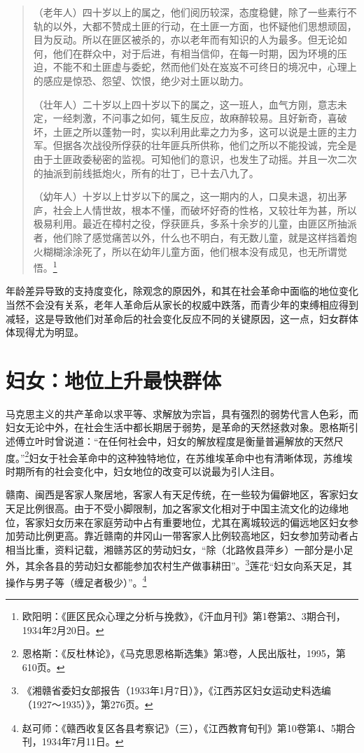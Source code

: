 \begin{quote}

（老年人）四十岁以上的属之，他们阅历较深，态度稳健，除了一些素行不轨的以外，大都不赞成土匪的行动，在土匪一方面，也怀疑他们思想顽固，目为反动。所以在匪区被杀的，亦以老年而有知识的人为最多。但无论如何，他们在群众中，对于后进，有相当信仰，在每一时期，因为环境的压迫，不能不和土匪虚与委蛇，然而他们处在岌岌不可终日的境况中，心理上的感应是惊恐、怨望、饮恨，绝少对土匪以助力。

（壮年人）二十岁以上四十岁以下的属之，这一班人，血气方刚，意志未定，一经刺激，不问事之如何，辄生反应，故麻醉较易。且好新奇，喜破坏，土匪之所以蓬勃一时，实以利用此辈之力为多，这可以说是土匪的主力军。但据各次战役所俘获的壮年匪兵所供称，他们之所以不能投诚，完全是由于土匪政委秘密的监视。可知他们的意识，也发生了动摇。并且一次二次的抽派到前线抵炮火，所有的壮丁，已十去八九了。

（幼年人）十岁以上廿岁以下的属之，这一期内的人，口臭未退，初出茅庐，社会上人情世故，根本不懂，而破坏好奇的性格，又较壮年为甚，所以极易利用。最近在樟村之役，俘获匪兵，多系十余岁的儿童，由匪区所抽派者，他们除了感觉痛苦以外，什么也不明白，有无数儿童，就是这样挡着炮火糊糊涂涂死了，所以在幼年儿童方面，他们根本没有成见，也无所谓觉悟。\footnote{欧阳明：《匪区民众心理之分析与挽救》，《汗血月刊》第1卷第2、3期合刊，1934年2月20日。}
\end{quote}


年龄差异导致的支持度变化，除观念的原因外，和其在社会革命中面临的地位变化当然不会没有关系，老年人革命后从家长的权威中跌落，而青少年的束缚相应得到减轻，这是导致他们对革命后的社会变化反应不同的关键原因，这一点，妇女群体体现得尤为明显。

\section{妇女：地位上升最快群体}


马克思主义的共产革命以求平等、求解放为宗旨，具有强烈的弱势代言人色彩，而妇女无论中外，在社会生活中都长期居于弱势，是革命的天然拯救对象。恩格斯引述傅立叶时曾说道：“在任何社会中，妇女的解放程度是衡量普遍解放的天然尺度。”\footnote{恩格斯：《反杜林论》，《马克思恩格斯选集》第3卷，人民出版社，1995，第610页。}妇女于社会革命中的这种独特地位，在苏维埃革命中也有清晰体现，苏维埃时期所有的社会变化中，妇女地位的改变可以说最为引人注目。


赣南、闽西是客家人聚居地，客家人有天足传统，在一些较为偏僻地区，客家妇女天足比例很高。由于不受小脚限制，加之客家文化相对于中国主流文化的边缘地位，客家妇女历来在家庭劳动中占有重要地位，尤其在离城较远的偏远地区妇女参加劳动比例更高。靠近赣南的井冈山一带客家人比例较高地区，妇女参加劳动者占相当比重，资料记载，湘赣苏区的劳动妇女，“除（北路攸县萍乡）一部分是小足外，其余各县的劳动妇女都能参加农村生产做事耕田”。\footnote{《湘赣省委妇女部报告（1933年1月7日）》，《江西苏区妇女运动史料选编（1927～1935）》，第276页。}莲花“妇女向系天足，其操作与男子等（缠足者极少）”。\footnote{赵可师：《赣西收复区各县考察记》（三），《江西教育旬刊》第10卷第4、5期合刊，1934年7月11日。}


